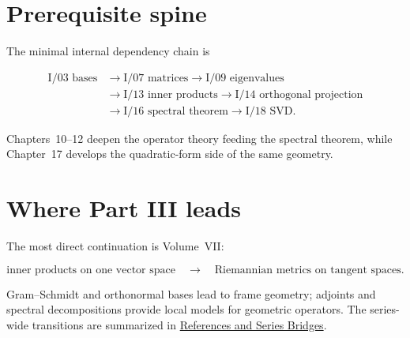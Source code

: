 \section*{Prerequisite spine}

The minimal internal dependency chain is

\[
\begin{aligned}
\text{I/03 bases}
&\longrightarrow \text{I/07 matrices}
\longrightarrow \text{I/09 eigenvalues}\\
&\longrightarrow \text{I/13 inner products}
\longrightarrow \text{I/14 orthogonal projection}\\
&\longrightarrow \text{I/16 spectral theorem}
\longrightarrow \text{I/18 SVD}.
\end{aligned}
\]

Chapters~10--12 deepen the operator theory feeding the spectral theorem, while
Chapter~17 develops the quadratic-form side of the same geometry.

\section*{Where Part III leads}

The most direct continuation is Volume~VII:

\[
\text{inner products on one vector space}
\quad\longrightarrow\quad
\text{Riemannian metrics on tangent spaces}.
\]

Gram--Schmidt and orthonormal bases lead to frame geometry; adjoints and
spectral decompositions provide local models for geometric operators. The
series-wide transitions are summarized in
\hyperref[sec:i-references-and-series-bridges]{References and Series Bridges}.
